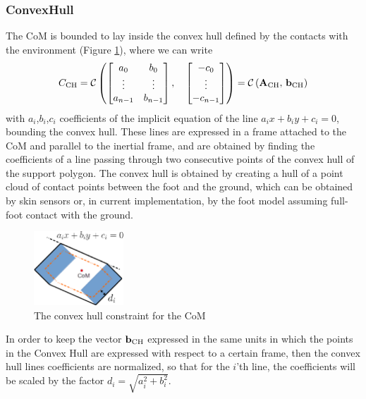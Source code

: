 \subsubsection{ConvexHull}
The CoM is bounded to lay inside the convex hull defined by the contacts with the environment (Figure \ref{com_ch}), where we can write 
\begin{equation}
C_\text{CH} = \mathcal{C} \left( 
\begin{bmatrix}     a_0     & b_0     \\ 
                    \vdots  & \vdots  \\
                    a_{n-1} & b_{n-1} \\
\end{bmatrix}, \quad 
\begin{bmatrix} -c_0     \\ 
                \vdots   \\
                -c_{n-1} \\
\end{bmatrix} \right) = \mathcal{C} \left( \mathbf{A}_\text{CH},\, \mathbf{b}_\text{CH} \right)
\end{equation}
with $a_i$,$b_i$,$c_i$ coefficients of the implicit equation of the line $a_ix+b_iy+c_i=0$, bounding the convex hull. These lines are  expressed in a frame attached to the CoM and parallel to the inertial frame, and are obtained by finding the coefficients of a line passing through two consecutive points of the convex hull of the support polygon. The convex hull is obtained by creating a hull of a point cloud of contact points between the foot and the ground, which can be obtained by skin sensors or, in current implementation, by the foot model assuming full-foot contact with the ground.
\begin{figure}[hb!]
  \center
  \vspace*{0.05in}
    \includegraphics[width=0.3\textwidth]{images/wholebody/com_ch}
    \caption{The convex hull constraint for the CoM}\label{com_ch}
\end{figure}
In order to keep the vector $\mathbf{b}_\text{CH}$ expressed in the same units in which the points in the Convex Hull are expressed with respect to a certain frame, then the convex hull lines coefficients are normalized, so that for the $i$'th line, the coefficients will be scaled by the factor $d_i=\sqrt{a_i^2+b_i^2}$.



